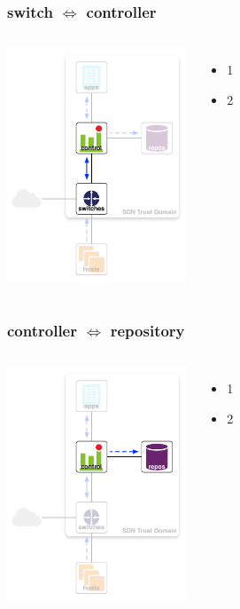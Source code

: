 \documentclass[t,handout]{beamer}
\begin{document}
\begin{frame}
\frametitle{switch $\Longleftrightarrow$  controller}
\begin{columns}[T]
\includegraphics[height=2.75in]{ra-sw-c}
\begin{itemize}
\item 1
\item 2
\end{itemize}
\end{columns}
\end{frame}

\begin{frame}
\frametitle{controller $\Longleftrightarrow$ repository}
\begin{columns}[T]
\includegraphics[height=2.75in]{ra-c-r}
\begin{itemize}
\item 1
\item 2
\end{itemize}
\end{columns}
\end{frame}
\end{document}
